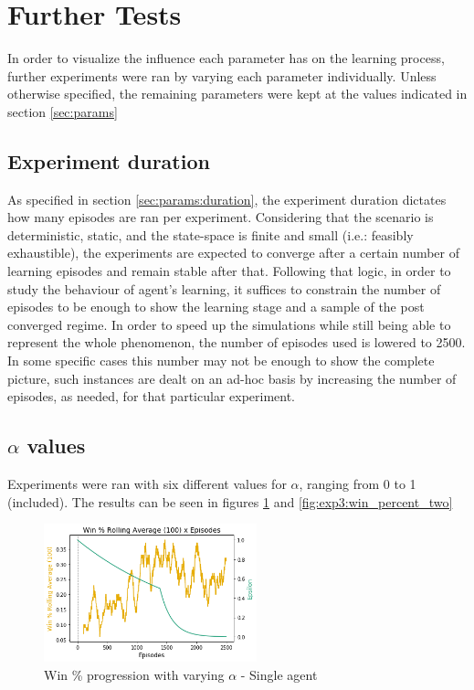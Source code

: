 \documentclass[11pt]{article}
\begin{document}
\section{Further Tests}\label{sec:further_tests}
    In order to visualize the influence each parameter has on the learning process, further experiments were ran by varying each parameter individually. Unless otherwise specified, the remaining parameters were kept at the values indicated in section \ref{sec:params}

    \subsection{Experiment duration}
        As specified in section \ref{sec:params:duration}, the experiment duration dictates how many episodes are ran per experiment. Considering that the scenario is deterministic, static, and the state-space is finite and small (i.e.: feasibly exhaustible), the experiments are expected to converge after a certain number of learning episodes and remain stable after that. Following that logic, in order to study the behaviour of agent's learning, it suffices to constrain the number of episodes to be enough to show the learning stage and a sample of the post converged regime. In order to speed up the simulations while still being able to represent the whole phenomenon, the number of episodes used is lowered to 2500. In some specific cases this number may not be enough to show the complete picture, such instances are dealt on an ad-hoc basis by increasing the number of episodes, as needed, for that particular experiment.

    \subsection{$\alpha$ values}
        Experiments were ran with six different values for $\alpha$, ranging from 0 to 1 (included). The results can be seen in figures \ref{fig:exp3:win_percent} and \ref{fig:exp3:win_percent_two}
        \begin{figure}[h]
            \includegraphics[height=4cm]{Images/exp_3/1_win_percent.png}
            \caption{Win \% progression with varying $\alpha$ - Single agent}
            \label{fig:exp3:win_percent}
        \end{figure}
\end{document}
